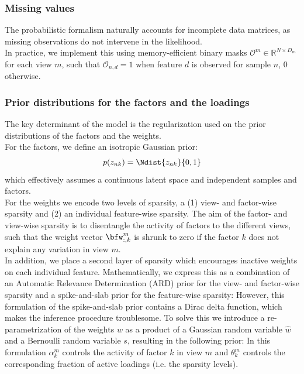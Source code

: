 \subsubsection{Missing values} \label{mofa:missing_values}
The probabilistic formalism naturally accounts for incomplete data matrices, as missing observations do not intervene in the likelihood.\\
In practice, we implement this using memory-efficient binary masks $\mathcal{O}^m \in \mathbb{R}^{N\times D_m}$ for each view $m$, such that $\mathcal{O}_{n,d} = 1$ when feature $d$ is observed for sample $n$, 0 otherwise. 

\subsubsection{Prior distributions for the factors and the loadings}  \label{mofa:loadings}
The key determinant of the model is the regularization used on the prior distributions of the factors and the weights.\\
For the factors, we define an isotropic Gaussian prior:
\begin{equation}
	p(z_{nk}) = \Ndist{z_{nk}}{0,1}
\end{equation}
which effectively assumes a continuous latent space and independent samples and factors.\\
For the weights we encode two levels of sparsity, a (1) view- and factor-wise sparsity and (2) an individual feature-wise sparsity. The aim of the factor- and view-wise sparsity is to disentangle the activity of factors to the different views, such that the weight vector $\bfw_{:,k}^m$ is shrunk to zero if the factor $k$ does not explain any variation in view $m$. \\
In addition, we place a second layer of sparsity which encourages inactive weights on each individual feature. Mathematically, we express this as a combination of an Automatic Relevance Determination (ARD) prior \cite{Mackay1996} for the view- and factor-wise sparsity and a spike-and-slab prior \cite{Mitchell1988} for the feature-wise sparsity:
However, this formulation of the spike-and-slab prior contains a Dirac delta function, which makes the inference procedure troublesome. To solve this we introduce a re-parametrization of the weights $w$ as a product of a Gaussian random variable $\hat{w}$ and a Bernoulli random variable $s$, \cite{Titsias2011} resulting in the following prior:
In this formulation $\alpha_k^m$ controls the activity of factor $k$ in view $m$ and $\theta_k^m$ controls the corresponding fraction of active loadings (i.e. the sparsity levels).\\


